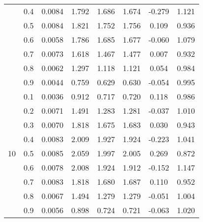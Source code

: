 \documentclass[11pt,a4paper]{report}
\begin{document}
\begin{longtable}{ | c | c || c | c | c | c | c | c | }
 & 0.4 & 0.0084 & 1.792 & 1.686 & 1.674 & -0.279 & 1.121 \\
 & 0.5 & 0.0084 & 1.821 & 1.752 & 1.756 & 0.109 & 0.936 \\
 & 0.6 & 0.0058 & 1.786 & 1.685 & 1.677 & -0.060 & 1.079 \\
 & 0.7 & 0.0073 & 1.618 & 1.467 & 1.477 & 0.007 & 0.932 \\
 & 0.8 & 0.0062 & 1.297 & 1.118 & 1.121 & 0.054 & 0.984 \\
 & 0.9 & 0.0044 & 0.759 & 0.629 & 0.630 & -0.054 & 0.995 \\
 \hline
\multirow{9}{*}{10} & 0.1 & 0.0036 & 0.912 & 0.717 & 0.720 & 0.118 & 0.986 \\
 & 0.2 & 0.0071 & 1.491 & 1.283 & 1.281 & -0.037 & 1.010 \\
 & 0.3 & 0.0070 & 1.818 & 1.675 & 1.683 & 0.030 & 0.943 \\
 & 0.4 & 0.0083 & 2.009 & 1.927 & 1.924 & -0.223 & 1.041 \\
 & 0.5 & 0.0085 & 2.059 & 1.997 & 2.005 & 0.269 & 0.872 \\
 & 0.6 & 0.0078 & 2.008 & 1.924 & 1.912 & -0.152 & 1.147 \\
 & 0.7 & 0.0083 & 1.818 & 1.680 & 1.687 & 0.110 & 0.952 \\
 & 0.8 & 0.0067 & 1.494 & 1.279 & 1.279 & -0.051 & 1.004 \\
 & 0.9 & 0.0056 & 0.898 & 0.724 & 0.721 & -0.063 & 1.020 \\
 \hline
\hline
\end{longtable}
\end{document}
